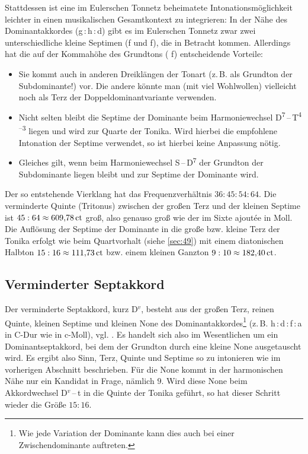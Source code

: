 Stattdessen ist eine im Eulerschen Tonnetz beheimatete Intonationsmöglichkeit
leichter in einen musikalischen Gesamtkontext zu integrieren: In der Nähe des
Dominantakkordes (g\,:\,\naturalm h\,:\,d) gibt es im Eulerschen Tonnetz zwar
zwei unterschiedliche kleine Septimen (\natural f und \naturalp f), die in
Betracht kommen.  Allerdings hat die auf der Kommahöhe des Grundtons (\natural
f) entscheidende Vorteile:
\begin{itemize}
\item Sie kommt auch in anderen Dreiklängen der Tonart (z.\,B. als Grundton der
  Subdominante!) vor.  Die andere könnte man (mit viel Wohlwollen) vielleicht
  noch als Terz der Doppeldominantvariante verwenden.
\item Nicht selten bleibt die Septime der Dominante beim Harmoniewechsel
  D\textsuperscript{$7$}\,–\,T\textsuperscript{$4$–$3$} liegen und wird zur
  Quarte der Tonika.  Wird hierbei die empfohlene Intonation der Septime
  verwendet, so ist hierbei keine Anpassung nötig.
\item Gleiches gilt, wenn beim Harmoniewechsel S\,–\,D\textsuperscript{$7$} der
  Grundton der Subdominante liegen bleibt und zur Septime der Dominante wird.
\end{itemize}
Der so entstehende Vierklang hat das Frequenzverhältnis $36:45:54:64$. Die
verminderte Quinte (Tritonus) zwischen der großen Terz und der kleinen Septime
ist $45:64\approx 609{,}78\,\mathrm{ct}$ groß, also genauso groß wie der im Sixte
ajoutée in Moll. Die Auflösung der Septime der Dominante in die große bzw.
kleine Terz der Tonika erfolgt wie beim Quartvorhalt (siehe \cref{sec:49}) mit
einem diatonischen Halbton $15:16\approx 111{,}73\,\mathrm{ct}$ bzw. einem kleinen
Ganzton $9:10\approx 182{,}40\,\mathrm{ct}$.

\subsection{Verminderter Septakkord}
\label{sec:dim7syn}


Der verminderte Septakkord, kurz D$^v$, besteht aus der großen Terz, reinen
Quinte, kleinen Septime und kleinen None des Dominantakkordes\footnote{Wie jede
  Variation der Dominante kann dies auch bei einer Zwischendominante auftreten.}
(z.\,B. h\,:\,d\,:\,f\,:\,\flat a in C-Dur wie in c-Moll),
vgl. \cite[{}11.1]{Skript}. Es handelt sich also im Wesentlichen um ein
Dominantseptakkord, bei dem der Grundton durch eine kleine None ausgetauscht
wird. Es ergibt also Sinn, Terz, Quinte und Septime so zu intonieren wie im
vorherigen Abschnitt beschrieben. Für die None kommt in der harmonischen Nähe
nur ein Kandidat in Frage, nämlich \flatp $9$.  Wird diese None beim
Akkordwechsel D$^v$\,–\,t in die Quinte der Tonika geführt, so hat dieser
Schritt wieder die Größe $15:16$.

